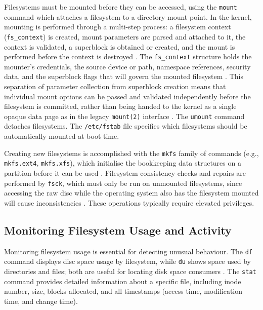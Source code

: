 Filesystems must be mounted before they can be accessed, using the \texttt{mount} command which attaches a filesystem to a directory mount point. In the kernel, mounting is performed through a multi-step process: a filesystem context (\texttt{fs\_context}) is created, mount parameters are parsed and attached to it, the context is validated, a superblock is obtained or created, and the mount is performed before the context is destroyed \parencite{KernelMountAPI}. The \texttt{fs\_context} structure holds the mounter's credentials, the source device or path, namespace references, security data, and the superblock flags that will govern the mounted filesystem \parencite{KernelMountAPI}. This separation of parameter collection from superblock creation means that individual mount options can be passed and validated independently before the filesystem is committed, rather than being handed to the kernel as a single opaque data page as in the legacy \texttt{mount(2)} interface \parencite{KernelMountAPI}. The \texttt{umount} command detaches filesystems. The \texttt{/etc/fstab} file specifies which filesystems should be automatically mounted at boot time.

Creating new filesystems is accomplished with the \texttt{mkfs} family of commands (e.g., \texttt{mkfs.ext4}, \texttt{mkfs.xfs}), which initialise the bookkeeping data structures on a partition before it can be used \parencite{LinuxSAGFilesystems}. Filesystem consistency checks and repairs are performed by \texttt{fsck}, which must only be run on unmounted filesystems, since accessing the raw disc while the operating system also has the filesystem mounted will cause inconsistencies \parencite{LinuxSAGFilesystems}. These operations typically require elevated privileges.

\subsection{Monitoring Filesystem Usage and Activity}
\label{MonitoringFilesystem}

Monitoring filesystem usage is essential for detecting unusual behaviour. The \texttt{df} command displays disc space usage by filesystem, while \texttt{du} shows space used by directories and files; both are useful for locating disk space consumers \parencite{LinuxSAGFilesystems}. The \texttt{stat} command provides detailed information about a specific file, including inode number, size, blocks allocated, and all timestamps (access time, modification time, and change time).


